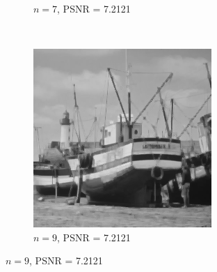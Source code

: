 \documentclass{article}
\begin{document}
\begin{enumerate}[label=(\alph*)]
\begin{figure}[!htb]
\begin{subfigure}[b]{0.3\textwidth}
            \caption{$n = 7$, PSNR = 7.2121}
        \end{subfigure}
        ~
        \begin{subfigure}[b]{0.3\textwidth}
            \includegraphics[width=\textwidth]{img/RSC9.png}
            \caption{$n = 9$, PSNR = 7.2121}
        \end{subfigure}
        
    

\end{figure}
\end{enumerate}
\end{document}
